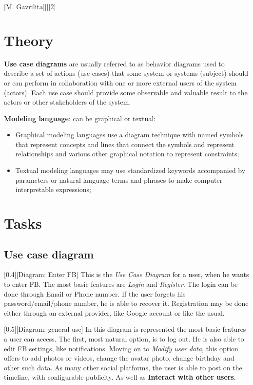 \documentclass{article}
\begin{document}
	[M. Gavrilita][][2]

	\section{Theory}
		\par \textbf{Use case diagrams} are usually referred to as behavior diagrams used to describe a set of actions (use cases) that some system or systems (subject) should or can perform in collaboration with one or more external users of the system (actors). Each use case should provide some observable and valuable result to the actors or other stakeholders of the system.

		\bigskip
		\textbf{Modeling language}: can be graphical or textual:
		\begin{itemize}
			\item Graphical modeling languages use a diagram technique with named symbols that represent concepts and lines that connect the symbols and represent relationships and various other graphical notation to represent constraints;
			\item Textual modeling languages may use standardized keywords accompanied by parameters or natural language terms and phrases to make computer-interpretable expressions;
		\end{itemize}

	\section{Tasks}
		\subsection{Use case diagram}
			[0.4][Diagram: Enter FB]
			This is the \textit{Use Case Diagram} for a user, when he wants to enter FB. The most basic features are \textit{Login} and \textit{Register}. The login can be done through Email or Phone number. If the user forgets his password/email/phone number, he is able to recover it. Registration may be done either through an external provider, like Google account or like the usual.


			[0.5][Diagram: general use]
			In this diagram is represented the most basic features a user can access. The first, most natural option, is to log out. He is also able to edit FB settings, like notifications. Moving on to \textit{Modify user data}, this option offers to add photos or videos, change the avatar photo, change birthday and other such data. As many other social platforms, the user is able to post on the timeline, with configurable publicity. As well as \textbf{Interact with other users}.
\end{document}
